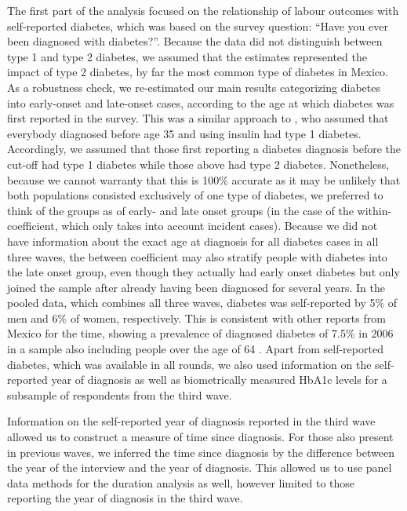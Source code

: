 \documentclass[12pt,english]{article}
\begin{document}
The first part of the analysis focused on the relationship of labour outcomes with self-reported diabetes, which was based on the survey question: “Have you ever been diagnosed with diabetes?”. Because the data did not distinguish between type 1 and type 2 diabetes, we assumed that the estimates represented the impact of type 2 diabetes, by far the most common type of diabetes in Mexico. As a robustness check, we re-estimated our main results categorizing diabetes into early-onset and late-onset cases, according to the age at which diabetes was first reported in the survey. This was a similar approach to \textcite{Alegre-Diaz2016}, who assumed that everybody diagnosed before age 35 and using insulin had type 1 diabetes. Accordingly, we assumed that those first reporting a diabetes diagnosis before the cut-off had type 1 diabetes while those above had type 2 diabetes. Nonetheless, because we cannot warranty that this is 100\% accurate as it may be unlikely that both populations consisted exclusively of one type of diabetes, we preferred to think of the groups as of early- and late onset groups (in the case of the within-coefficient, which only takes into account incident cases). Because we did not have information about the exact age at diagnosis for all diabetes cases in all three waves, the between coefficient may also stratify people with diabetes into the late onset group, even though they actually had early onset diabetes but only joined the sample after already having been diagnosed for several years. In the pooled data, which combines all three waves, diabetes was self-reported by 5\% of men and 6\% of women, respectively. This is consistent with other reports from Mexico for the time, showing a prevalence of diagnosed diabetes of 7.5\% in 2006 in a sample also including people over the age of 64 \parencite{Barquera2013}. Apart from self-reported diabetes, which was available in all rounds, we also used information on the self-reported year of diagnosis as well as biometrically measured \ac{HbA1c} levels for a subsample of respondents from the third wave.


Information on the self-reported year of diagnosis reported in the third wave allowed us to construct a measure of time since diagnosis. For those also present in previous waves, we inferred the time since diagnosis by the difference between the year of the interview and the year of diagnosis. This allowed us to use panel data methods for the duration analysis as well, however limited to those reporting the year of diagnosis in the third wave. 
\end{document}
